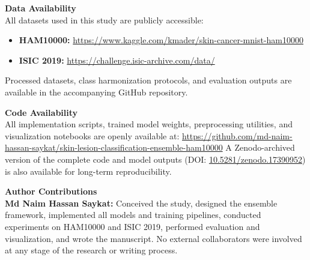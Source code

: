 \documentclass[pdflatex,sn-mathphys-num]{sn-jnl}%
\theoremstyle{thmstyleone}%
\theoremstyle{thmstyletwo}%
\theoremstyle{thmstylethree}%
\begin{document}
\bigskip
\noindent
\textbf{Data Availability} \\
All datasets used in this study are publicly accessible:  
\begin{itemize}
    \item \textbf{HAM10000:} \url{https://www.kaggle.com/kmader/skin-cancer-mnist-ham10000}
    \item \textbf{ISIC 2019:} \url{https://challenge.isic-archive.com/data/}
\end{itemize}
Processed datasets, class harmonization protocols, and evaluation outputs are available in the accompanying GitHub repository.

\bigskip
\noindent
\textbf{Code Availability} \\
All implementation scripts, trained model weights, preprocessing utilities, and visualization notebooks are openly available at:  
\url{https://github.com/md-naim-hassan-saykat/skin-lesion-classification-ensemble-ham10000}  
A Zenodo-archived version of the complete code and model outputs (DOI: \href{https://doi.org/10.5281/zenodo.17390952}{10.5281/zenodo.17390952}) is also available for long-term reproducibility.

\bigskip
\noindent
\textbf{Author Contributions} \\
\textbf{Md Naim Hassan Saykat:} Conceived the study, designed the ensemble framework, implemented all models and training pipelines, conducted experiments on HAM10000 and ISIC 2019, performed evaluation and visualization, and wrote the manuscript.  
No external collaborators were involved at any stage of the research or writing process.
\end{document}
